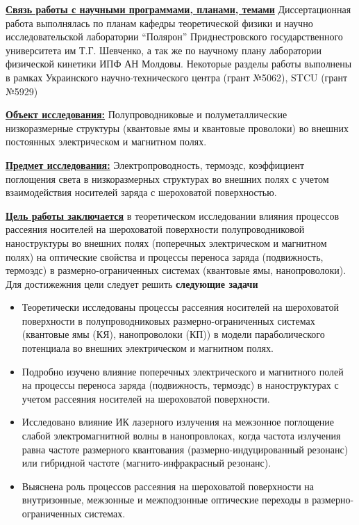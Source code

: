 \underline{\textbf{Связь работы с научными программами, планами, темами}}
Диссертационная работа выполнялась по планам кафедры теоретической физики и научно исследовательской лаборатории “Полярон” Приднестровского государственного университета им Т.Г. Шевченко, а так же по научному плану лаборатории физической кинетики ИПФ АН Молдовы. Некоторые разделы работы выполнены в рамках Украинского научно-технического центра (грант №5062), STCU (грант №5929)

\underline{\textbf{Объект исследования:}} Полупроводниковые и полуметаллические низкоразмерные структуры (квантовые ямы и квантовые проволоки) во внешних постоянных электрическом и магнитном полях.

\underline{\textbf{Предмет исследования:}} Электропроводность, термоэдс, коэффициент поглощения света в низкоразмерных структурах во внешних полях с учетом взаимодействия носителей заряда с шероховатой поверхностью.

\underline{\textbf{Цель работы заключается}}
в теоретическом исследовании влияния процессов рассеяния носителей на шероховатой поверхности полупроводниковой наноструктуры во внешних полях (поперечных электрическом и магнитном полях) на оптические свойства и процессы переноса заряда (подвижность, термоэдс) в размерно-ограниченных системах (квантовые ямы, нанопроволоки). Для достижежния цели следует решить \textbf{следующие задачи}
\begin{itemize}
	\item Теоретически исследованы процессы рассеяния носителей на шероховатой поверхности в полупроводниковых размерно-ограниченных системах (квантовые ямы (КЯ), нанопроволоки (КП)) в модели параболического потенциала во внешних электрическом и магнитном полях.
	\item Подробно изучено влияние поперечных электрического и магнитного полей на процессы переноса заряда (подвижность, термоэдс) в наноструктурах с учетом рассеяния носителей на шероховатой поверхности.
	\item Исследовано влияние ИК лазерного излучения на межзонное поглощение слабой электромагнитной волны в нанопровлоках, когда частота излучения равна частоте размерного квантования (размерно-индуцированный резонанс) или гибридной частоте (магнито-инфракрасный резонанс).
	\item Выяснена роль процессов рассеяния на шероховатой поверхности на внутризонные, межзонные и межподзонные оптические переходы в размерно-ограниченных системах.
\end{itemize}

